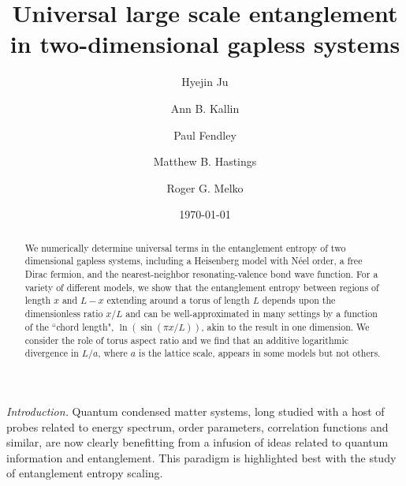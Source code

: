 \documentclass[prl,aps,twocolumn,floatfix,amsmath,amssymb,superscriptaddress,tightenlines]{revtex4}
\begin{document}
\newcommand{\be}{\begin{equation}}
\newcommand{\ee}{\end{equation}}

\date{\today}
\title{Universal large scale entanglement in
  two-dimensional gapless systems}

\author{Hyejin Ju}

\author{Ann B. Kallin}

\author{Paul Fendley}

\author{Matthew B. Hastings}

\author{Roger G. Melko}

\begin{abstract} 
We numerically determine universal terms in the entanglement entropy of two dimensional gapless systems, including a Heisenberg model with
N\'eel order, a free Dirac fermion, and the nearest-neighbor resonating-valence
bond wave function.
For a variety of different models, we show that the entanglement entropy between regions of length $x$ and $L-x$ extending around a torus of
length $L$ depends upon the dimensionless ratio $x/L$ and can be well-approximated in many settings by a function of the ``chord length",
$\ln(\sin(\pi x/L))$, akin to the result in one dimension.
We consider the role of torus aspect ratio and we find that an additive logarithmic divergence in $L/a$, where $a$ is the lattice scale, appears in some models but not others.
\end{abstract}
\maketitle

{\it Introduction.} Quantum condensed matter systems, long studied with a host of probes related to energy spectrum, order parameters, correlation functions and similar, are now clearly benefitting from a infusion of ideas related to quantum information and entanglement.
This paradigm is highlighted best with the study of entanglement entropy scaling.  
\end{document}
